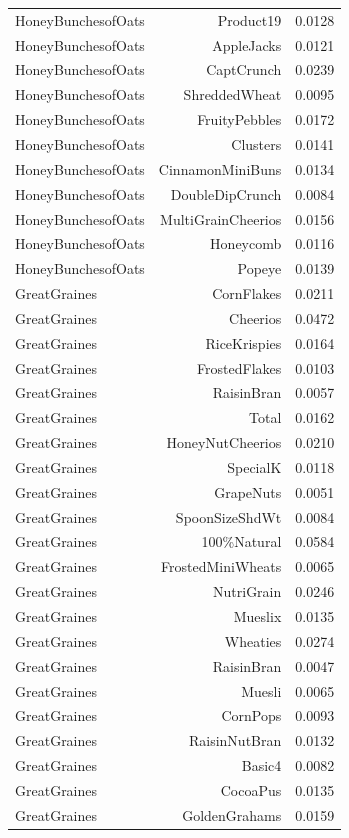 \begin{longtable}{@{}lrr@{}}
HoneyBunchesofOats & Product19 & 0.0128 \\
HoneyBunchesofOats & AppleJacks & 0.0121 \\
HoneyBunchesofOats & CaptCrunch & 0.0239 \\
HoneyBunchesofOats & ShreddedWheat & 0.0095 \\
HoneyBunchesofOats & FruityPebbles & 0.0172 \\
HoneyBunchesofOats & Clusters & 0.0141 \\
HoneyBunchesofOats & CinnamonMiniBuns & 0.0134 \\
HoneyBunchesofOats & DoubleDipCrunch & 0.0084 \\
HoneyBunchesofOats & MultiGrainCheerios & 0.0156 \\
HoneyBunchesofOats & Honeycomb & 0.0116 \\
HoneyBunchesofOats & Popeye & 0.0139 \\
GreatGraines & CornFlakes & 0.0211 \\
GreatGraines & Cheerios & 0.0472 \\
GreatGraines & RiceKrispies & 0.0164 \\
GreatGraines & FrostedFlakes & 0.0103 \\
GreatGraines & RaisinBran & 0.0057 \\
GreatGraines & Total & 0.0162 \\
GreatGraines & HoneyNutCheerios & 0.0210 \\
GreatGraines & SpecialK & 0.0118 \\
GreatGraines & GrapeNuts & 0.0051 \\
GreatGraines & SpoonSizeShdWt & 0.0084 \\
GreatGraines & 100\%Natural & 0.0584 \\
GreatGraines & FrostedMiniWheats & 0.0065 \\
GreatGraines & NutriGrain & 0.0246 \\
GreatGraines & Mueslix & 0.0135 \\
GreatGraines & Wheaties & 0.0274 \\
GreatGraines & RaisinBran & 0.0047 \\
GreatGraines & Muesli & 0.0065 \\
GreatGraines & CornPops & 0.0093 \\
GreatGraines & RaisinNutBran & 0.0132 \\
GreatGraines & Basic4 & 0.0082 \\
GreatGraines & CocoaPus & 0.0135 \\
GreatGraines & GoldenGrahams & 0.0159 \\

\end{longtable}
